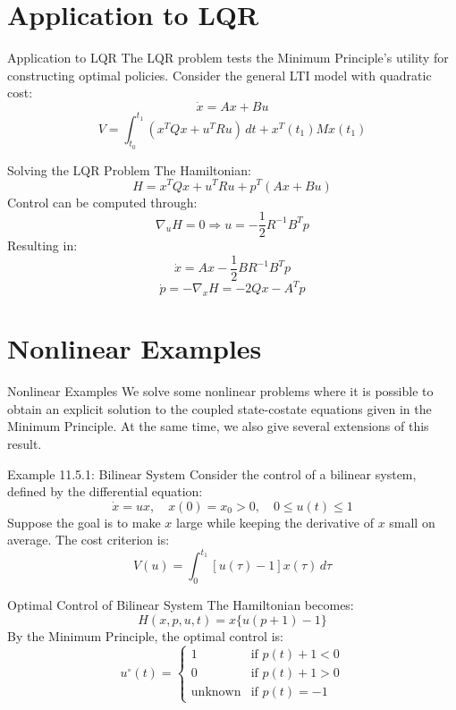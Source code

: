 \documentclass[10pt]{beamer}
\begin{document}
\section{Application to LQR}
  
\begin{frame}[fragile]{Application to LQR}
  The LQR problem tests the Minimum Principle's utility for constructing optimal policies. Consider the general LTI model with quadratic cost:
  \[
  \dot{x} = Ax + Bu
  \]
  \[
  V = \int_{t_0}^{t_1} (x^T Q x + u^T R u) \, dt + x^T(t_1) M x(t_1)
  \]
\end{frame}
  
\begin{frame}[fragile]{Solving the LQR Problem}
  The Hamiltonian:
  \[
  H = x^T Q x + u^T R u + p^T (Ax + Bu)
  \]
  Control can be computed through:
  \[
  \nabla_u H = 0 \Rightarrow u = -\frac{1}{2} R^{-1} B^T p
  \]
  Resulting in:
  \[
  \dot{x} = Ax - \frac{1}{2} BR^{-1} B^T p
  \]
  \[
  \dot{p} = -\nabla_x H = -2Q x - A^T p
  \]
\end{frame}
  
\section{Nonlinear Examples}

\begin{frame}[fragile]{Nonlinear Examples}
  We solve some nonlinear problems where it is possible to obtain an explicit solution to the coupled state-costate equations given in the Minimum Principle. At the same time, we also give several extensions of this result.
\end{frame}
  
\begin{frame}[fragile]{Example 11.5.1: Bilinear System}
  Consider the control of a bilinear system, defined by the differential equation:
  \[
  \dot{x} = ux, \quad x(0) = x_0 > 0, \quad 0 \le u(t) \le 1
  \]
  Suppose the goal is to make \( x \) large while keeping the derivative of \( x \) small on average. The cost criterion is:
  \[
  V(u) = \int_0^{t_1} [u(\tau) - 1]x(\tau) \, d\tau
  \]
\end{frame}
  
\begin{frame}[fragile]{Optimal Control of Bilinear System}
  The Hamiltonian becomes:
  \[
  H(x, p, u, t) = x \{ u(p + 1) - 1 \}
  \]
  By the Minimum Principle, the optimal control is:
  \[
  u^\circ(t) = \begin{cases}
  1 & \text{if } p(t) + 1 < 0 \\
  0 & \text{if } p(t) + 1 > 0 \\
  \text{unknown} & \text{if } p(t) = -1
  \end{cases}
  \]
\end{frame}
  
\end{document}
